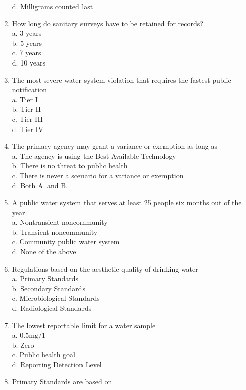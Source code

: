 \begin{enumerate}
d. Milligrams counted last\\
\item How long do sanitary surveys have to be retained for records?\\
a. 3 years\\
b. 5 years\\
c. 7 years\\
d. 10 years\\
\item The most severe water system violation that requires the fastest public notification\\
a. Tier I\\
b. Tier II\\
c. Tier III\\
d. Tier IV
\item The primacy agency may grant a variance or exemption as long as\\
a. The agency is using the Best Available Technology\\
b. There is no threat to public health\\
c. There is never a scenario for a variance or exemption\\
d. Both A. and B.\\
\item A public water system that serves at least 25 people six months out of the year\\
a. Nontransient noncommunity\\
b. Transient noncommunity\\
c. Community public water system\\
d. None of the above\\
\item Regulations based on the aesthetic quality of drinking water\\
a. Primary Standards\\
b. Secondary Standards\\
c. Microbiological Standards\\
d. Radiological Standards\\
\item The lowest reportable limit for a water sample\\
a. $0.5 \mathrm{mg} / 1$\\
b. Zero\\
c. Public health goal\\
d. Reporting Detection Level\\
\item Primary Standards are based on\\

\end{enumerate}

